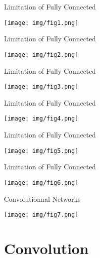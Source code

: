 \documentclass[9pt]{beamer}
\begin{document}
\begin{frame}{Limitation of Fully Connected }
\begin{center}
	\texttt{[image: img/fig1.png]} 
\end{center}
\end{frame}

\begin{frame}{Limitation of Fully Connected }
\begin{center}
	\texttt{[image: img/fig2.png]} 
\end{center}
\end{frame}

\begin{frame}{Limitation of Fully Connected }
\begin{center}
	\texttt{[image: img/fig3.png]} 
\end{center}
\end{frame}

\begin{frame}{Limitation of Fully Connected }
\begin{center}
	\texttt{[image: img/fig4.png]} 
\end{center}
\end{frame}

\begin{frame}{Limitation of Fully Connected }
\begin{center}
	\texttt{[image: img/fig5.png]} 
\end{center}
\end{frame}

\begin{frame}{Limitation of Fully Connected }
\begin{center}
	\texttt{[image: img/fig6.png]} 
\end{center}
\end{frame}

\begin{frame}{Convolutionnal Networks}
\begin{center}
	\texttt{[image: img/fig7.png]} 
\end{center}
\end{frame}


\section{Convolution}
\end{document}
